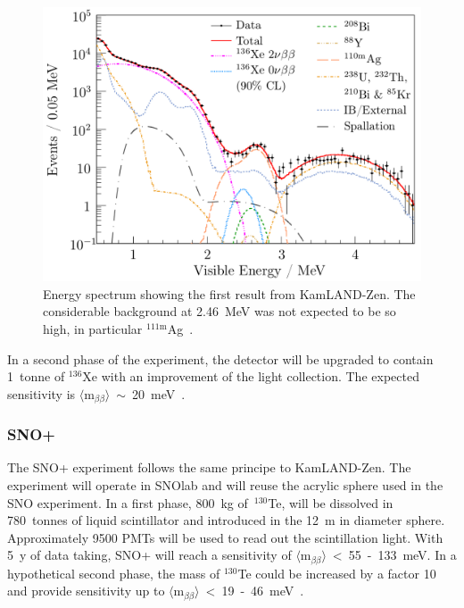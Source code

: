 \documentclass[main.tex]{subfiles}
\begin{document}

\begin{figure}[h!]
\begin{center}
\includegraphics[scale=0.3]{pictures/Chap2/KamLANDZenResults.png}
\caption{Energy spectrum showing the first result from KamLAND-Zen. The considerable background at 2.46~MeV was not expected to be so high, in particular $^{\text{111m}}$Ag~\cite{KamLAND-Zen}.}
\label{KamLANDZenResults}
\end{center}
\end{figure}



\NI In a second phase of the experiment, the detector will be upgraded to contain 1~tonne of $^{\text{136}}$Xe with an improvement of the light collection. The expected sensitivity is $\langle \text{m}_{\beta\beta} \rangle$~$\sim$~20~meV~\cite{KamLAND-Zen3}.


\FloatBarrier


\subsubsection{SNO+}


\NI The SNO+ experiment follows the same principe to KamLAND-Zen. The experiment will operate in SNOlab and will reuse the acrylic sphere used in the SNO experiment. In a first phase, 800~kg of~$^{\text{130}}$Te, will be dissolved in 780~tonnes of liquid scintillator and introduced in the 12~m in diameter sphere. Approximately 9500 PMTs will be used to read out the scintillation light. With 5~y of data taking, SNO+ will reach a sensitivity of $\langle \text{m}_{\beta\beta} \rangle$~<~55~-~133~meV. In a hypothetical second phase, the mass of $^{\text{130}}$Te could be increased by a factor 10 and provide sensitivity up to  $\langle \text{m}_{\beta\beta} \rangle$~<~19~-~46~meV~\cite{SNO+}.
\end{document}
